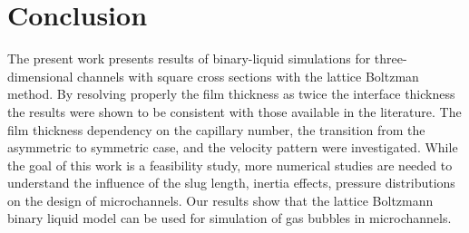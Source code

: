 \documentclass{article}
\begin{document}
\section{Conclusion}
The present work presents results of binary-liquid simulations for three-dimensional channels with square
cross sections with the lattice Boltzman method. By resolving properly the film thickness as twice the
interface thickness \cite{kuzmin-binary2d} the results were shown to be consistent with those
available in the literature. The film thickness dependency on the capillary number, the
transition from the asymmetric to symmetric case, and the velocity pattern were investigated. While
the goal of this work is a feasibility study, more numerical studies are needed to
understand the influence of the slug length, inertia effects, pressure distributions
\cite{kreutzer-taylor,yue-mass} on the design of microchannels. Our results show that the lattice
Boltzmann binary liquid model can be used for simulation of gas bubbles in microchannels. 

\appendix
\end{document}
